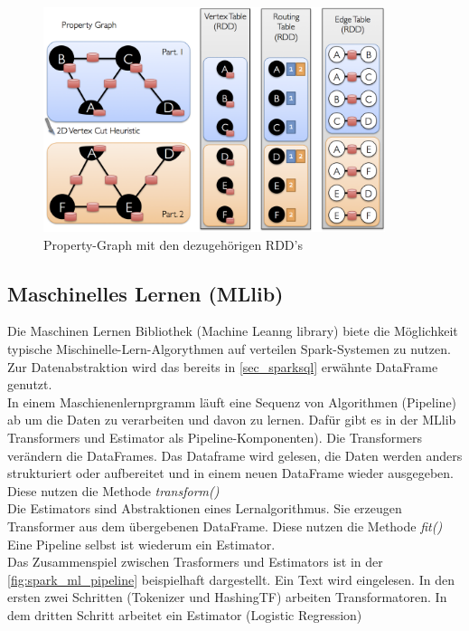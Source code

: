 \begin{figure}[h]
  \centering
  \includegraphics[width=100mm]{./bilder/vertex_routing_edge_tables.png}
  \caption{Property-Graph mit den dezugehörigen RDD's \cite{SPGRAPHX}}\label{fig:spark_graphx}
\end{figure}





\newpage
\subsection{Maschinelles Lernen (MLlib)}\label{sec_sparkmlib}

Die Maschinen Lernen Bibliothek (Machine Leanng library) biete die Möglichkeit typische Mischinelle-Lern-Algorythmen auf verteilen Spark-Systemen zu nutzen. Zur Datenabstraktion wird das bereits in \ref{sec_sparksql} erwähnte DataFrame genutzt.  \\

\noindent
In einem Maschienenlernprgramm läuft eine Sequenz von Algorithmen (Pipeline) ab um die Daten zu verarbeiten und davon zu lernen. 
Dafür gibt es in der MLlib  Transformers und Estimator als Pipeline-Komponenten).
Die Transformers verändern die DataFrames. Das Dataframe wird gelesen, die Daten werden anders strukturiert oder aufbereitet und in einem neuen DataFrame wieder ausgegeben. Diese nutzen die Methode \textsl{transform()}\\
Die Estimators sind Abstraktionen eines Lernalgorithmus. Sie erzeugen Transformer aus dem übergebenen DataFrame. Diese nutzen die Methode \textsl{fit()}
Eine Pipeline selbst ist wiederum ein Estimator. \\

\noindent
Das Zusammenspiel zwischen Trasformers und Estimators ist in der \autoref{fig:spark_ml_pipeline} beispielhaft dargestellt. Ein Text wird eingelesen. In den ersten zwei Schritten (Tokenizer und HashingTF) arbeiten Transformatoren. In dem dritten Schritt arbeitet ein Estimator (Logistic Regression)
 
